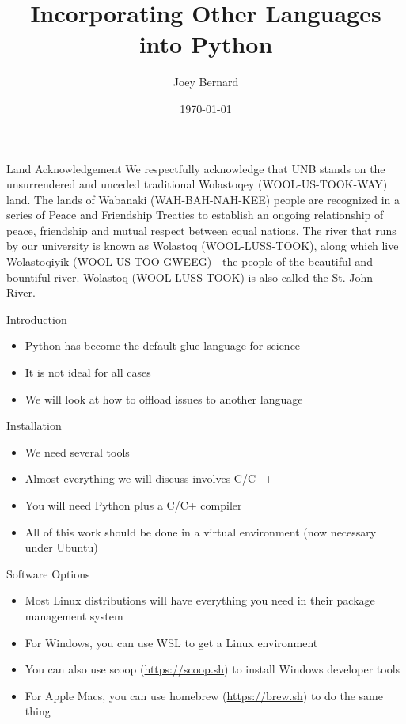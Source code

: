 \documentclass[presentation]{beamer}
\author{Joey Bernard}
\date{\today}
\title{Incorporating Other Languages into Python}
\begin{document}
\maketitle
\begin{frame}[label=land-acknowledgement]{Land Acknowledgement}
We respectfully acknowledge that UNB stands on the unsurrendered and unceded traditional Wolastoqey (WOOL-US-TOOK-WAY) land. The lands of Wabanaki (WAH-BAH-NAH-KEE) people are recognized in a series of Peace and Friendship Treaties to establish an ongoing relationship of peace, friendship and mutual respect between equal nations. The river that runs by our university is known as Wolastoq (WOOL-LUSS-TOOK), along which live Wolastoqiyik (WOOL-US-TOO-GWEEG) - the people of the beautiful and bountiful river. Wolastoq (WOOL-LUSS-TOOK) is also called the St. John River.
\end{frame}
\begin{frame}[label=introduction]{Introduction}
\begin{itemize}
\item Python has become the default glue language for science
\item It is not ideal for all cases
\item We will look at how to offload issues to another language
\end{itemize}
\end{frame}
\begin{frame}[label=installation]{Installation}
\begin{itemize}
\item We need several tools
\item Almost everything we will discuss involves C/C++
\item You will need Python plus a C/C+ compiler
\item All of this work should be done in a virtual environment (now
necessary under Ubuntu)
\end{itemize}
\end{frame}
\begin{frame}[label=software-options]{Software Options}
\begin{itemize}
\item Most Linux distributions will have everything you need in their
package management system
\item For Windows, you can use WSL to get a Linux environment
\item You can also use scoop (\url{https://scoop.sh}) to install Windows developer
tools
\item For Apple Macs, you can use homebrew (\url{https://brew.sh}) to do the same
thing
\end{itemize}
\end{frame}
\end{document}
